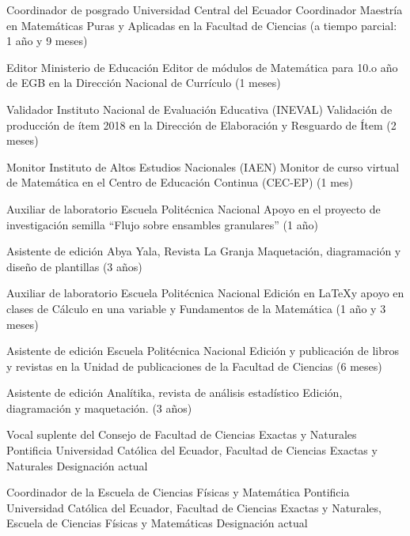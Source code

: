 \documentclass[
	a4paper,
	maincolor=cvblue!70!blue,
	sidecolor=gray!30,
	sectioncolor=cvblue!70!blue,
    sidebarwidth=7.5cm,
	topbottommargin=20pt,
	leftrightmargin=20pt,
]{fortysecondscv}
\begin{document}

    {Coordinador de posgrado}
    {Universidad Central del Ecuador}
    {Coordinador Maestría en Matemáticas Puras y Aplicadas en la Facultad de Ciencias (a tiempo parcial: 1 año y 9 meses)}

    {Editor}
    {Ministerio de Educación}
    {Editor de módulos de Matemática para 10.o año de EGB en la Dirección Nacional de Currículo (1 meses)}

    {Validador}
    {Instituto Nacional de Evaluación Educativa (INEVAL)}
    {Validación de producción de ítem 2018 en la Dirección de Elaboración y Resguardo de Ítem (2 meses)}

    {Monitor}
    {Instituto de Altos Estudios Nacionales (IAEN)}
    {Monitor de curso virtual de Matemática en el Centro de Educación Continua (CEC-EP) (1 mes)}

    {Auxiliar de laboratorio}
    {Escuela Politécnica Nacional}
    {Apoyo en el proyecto de investigación semilla ``Flujo sobre ensambles granulares'' (1 año)}

    {Asistente de edición}
    {Abya Yala, Revista La Granja}
    {Maquetación, diagramación y diseño de plantillas (3 años)}

    {Auxiliar de laboratorio}
    {Escuela Politécnica Nacional}
    {Edición en \LaTeX y apoyo en clases de Cálculo en una variable y Fundamentos de la Matemática (1 año y 3 meses)}

    {Asistente de edición}
    {Escuela Politécnica Nacional}
    {Edición y publicación de libros y revistas en la Unidad de publicaciones de la Facultad de Ciencias (6 meses)}

    {Asistente de edición}
    {Analítika, revista de análisis estadístico}
    {Edición, diagramación y maquetación. (3 años)}


\makebacksidebar


    {Vocal suplente del Consejo de Facultad de Ciencias Exactas y Naturales}
    {Pontificia Universidad Católica del Ecuador, Facultad de Ciencias Exactas y Naturales}
    {Designación actual}

    {Coordinador de la Escuela de Ciencias Físicas y Matemática}
    {Pontificia Universidad Católica del Ecuador, Facultad de Ciencias Exactas y Naturales, Escuela de Ciencias Físicas y Matemáticas}
    {Designación actual}
    
\end{document}
